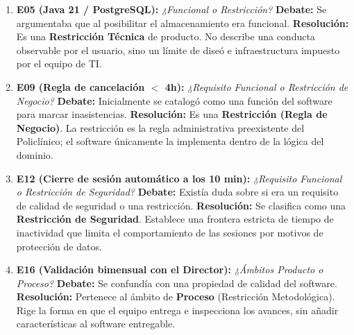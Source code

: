\documentclass[conference]{IEEEtran}
\begin{document}
	\begin{enumerate}
		\item \textbf{E05 (Java 21 / PostgreSQL):} \emph{¿Funcional o Restricci\'on?}  
		\textbf{Debate:} Se argumentaba que al posibilitar el almacenamiento era funcional.  
		\textbf{Resoluci\'on:} Es una \textbf{Restricci\'on T\'ecnica} de producto. No describe una conducta observable por el usuario, sino un l\'imite de dise\'o e infraestructura impuesto por el equipo de TI.
		
		\item \textbf{E09 (Regla de cancelaci\'on $<$ 4h):} \emph{¿Requisito Funcional o Restricci\'on de Negocio?}  
		\textbf{Debate:} Inicialmente se catalog\'o como una funci\'on del software para marcar inasistencias.  
		\textbf{Resoluci\'on:} Es una \textbf{Restricci\'on (Regla de Negocio)}. La restricci\'on es la regla administrativa preexistente del Policl\'inico; el software \'unicamente la implementa dentro de la l\'ogica del dominio.
		
		\item \textbf{E12 (Cierre de sesi\'on autom\'atico a los 10 min):} \emph{¿Requisito Funcional o Restricci\'on de Seguridad?}  
		\textbf{Debate:} Exist\'ia duda sobre si era un requisito de calidad de seguridad o una restricci\'on.  
		\textbf{Resoluci\'on:} Se clasifica como una \textbf{Restricci\'on de Seguridad}. Establece una frontera estricta de tiempo de inactividad que limita el comportamiento de las sesiones por motivos de protecci\'on de datos.
		
		\item \textbf{E16 (Validaci\'on bimensual con el Director):} \emph{¿Ámbitos Producto o Proceso?}  
		\textbf{Debate:} Se confund\'ia con una propiedad de calidad del software.  
		\textbf{Resoluci\'on:} Pertenece al \'ambito de \textbf{Proceso} (Restricci\'on Metodol\'ogica). Rige la forma en que el equipo entrega e inspecciona los avances, sin a\~nadir caracter\'isticas al software entregable.
	\end{enumerate}
	
\end{document}
